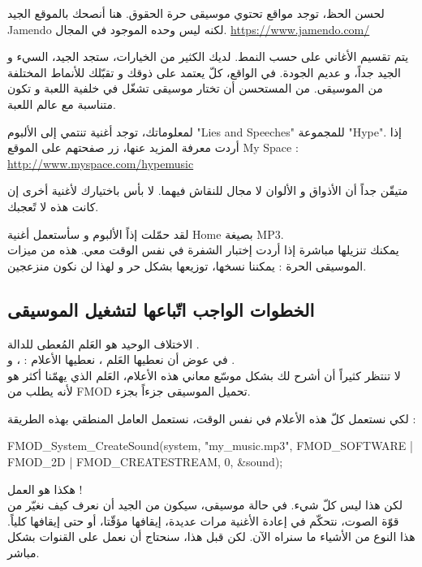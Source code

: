 لحسن الحظ، توجد مواقع تحتوي موسيقى حرة الحقوق. هنا أنصحك بالموقع الجيد
\textenglish{Jamendo}
لكنه ليس وحده الموجود في المجال.
\url{https://www.jamendo.com/}

يتم تقسيم الأغاني على حسب النمط. لديك الكثير من الخيارات، ستجد الجيد، السيء و الجيد جداً، و عديم الجودة. في الواقع، كلّ يعتمد على ذوقك و تقبّلك للأنماط المختلفة من الموسيقى. من المستحسن أن تختار موسيقى تشغّل في خلفية اللعبة و تكون متناسبة مع عالم اللعبة.

لمعلوماتك، توجد أغنية تنتمي إلى الألبوم
"\textenglish{Lies and Speeches}"
للمجموعة
"\textenglish{Hype}".
إذا أردت معرفة المزيد عنها، زر صفحتهم على الموقع
\textenglish{My Space} :
\url{http://www.myspace.com/hypemusic}

\begin{information}
متيقّن جداً أن الأذواق و الألوان لا مجال للنقاش فيهما. لا بأس باختيارك لأغنية أخرى إن كانت هذه لا تًعجبك.
\end{information}

لقد حمّلت إذاً الألبوم و سأستعمل أغنية
\textenglish{Home}
بصيغة
\textenglish{MP3}.\\
يمكنك تنزيلها مباشرة إذا أردت إختبار الشفرة في نفس الوقت معي. هذه من ميزات الموسيقى الحرة : يمكننا نسخها، توزيعها بشكل حر و لهذا لن نكون منزعجين.

\subsection{الخطوات الواجب اتّباعها لتشغيل الموسيقى}

الاختلاف الوحيد هو العَلم المُعطى للدالة
.\\
في عوض أن نعطيها العَلم
،
نعطيها الأعلام :
،  و .\\
لا تنتظر كثيراً أن أشرح لك بشكل موسّع معاني هذه الأعلام، العَلم الذي يهمّنا أكثر هو
لأنه يطلب من
\textenglish{FMOD}
تحميل الموسيقى جزءاً بجزء.

لكي نستعمل كلّ هذه الأعلام في نفس الوقت، نستعمل العامل المنطقي
\InlineCode{|}
بهذه الطريقة :

\begin{Csource}
FMOD_System_CreateSound(system, "my_music.mp3", FMOD_SOFTWARE | FMOD_2D | FMOD_CREATESTREAM, 0, &sound);
\end{Csource}

هكذا هو العمل  !\\
لكن هذا ليس كلّ شيء. في حالة موسيقى، سيكون من الجيد أن نعرف كيف نغيّر من قوّة الصوت، نتحكّم في إعادة الأغنية مرات عديدة، إيقافها مؤقّتا، أو حتى إيقافها كلياً. هذا النوع من الأشياء ما سنراه الآن. لكن قبل هذا، سنحتاج أن نعمل على القنوات بشكل مباشر.

